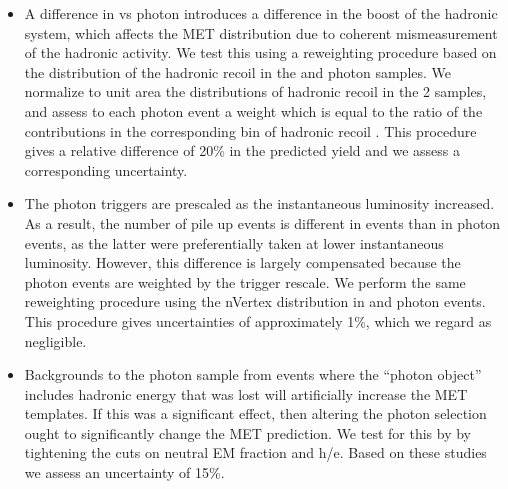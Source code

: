 \begin{table}[hbt]
\begin{center}
\begin{tabular}{l|cc}
\hline
\end{tabular}
\end{center}
\end{table}


\begin{itemize}
\item A difference in \Z \pt vs photon \pt introduces a difference in the boost of the hadronic system,
  which affects the MET distribution due to coherent mismeasurement of the hadronic activity. 
  We test this using a reweighting procedure based on the distribution of the hadronic recoil \pt
  in the \Z and photon samples. We normalize to unit area the distributions of hadronic recoil \pt in 
  the 2 samples,
  and assess to each photon event a weight which is equal to the ratio of the \Z \pt contributions in 
  the corresponding
  bin of hadronic recoil \pt. This procedure gives a relative difference of 
  20\% %
  in the predicted yield and we assess a corresponding uncertainty.

\item The photon triggers are prescaled as the instantaneous luminosity increased. As a result, the 
  number of pile up events is different in \Z events than in photon events, 
  as the latter were preferentially taken at lower instantaneous luminosity. However, this difference
  is largely compensated because the photon events are weighted by the trigger rescale. We perform the
  same reweighting procedure using the nVertex distribution in \Z and photon events. This procedure 
  gives uncertainties of approximately 1\%, which we regard as negligible.

\item Backgrounds to the photon sample from events where the ``photon object'' includes 
  hadronic energy that was lost will artificially increase the MET templates. 
  If this was a significant effect, then  altering the photon selection ought to significantly 
  change the MET prediction. We test for this
  by by tightening the cuts on neutral EM fraction and h/e. 
  Based on these studies we assess an uncertainty of 
  15\%. %



\end{itemize}


